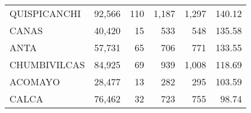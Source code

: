 \begin{tabular}{lrrrrr}
	\cellcolor[HTML]{FFFFC7}QUISPICANCHI                                               & 92,566                                                         & 110                                                      & 1,187                                                    & 1,297                                                               & 140.12                                                                       \\
	\cellcolor[HTML]{FFFFC7}CANAS                                                      & 40,420                                                         & 15                                                       & 533                                                      & 548                                                                 & 135.58                                                                       \\
	\cellcolor[HTML]{FFFFC7}ANTA                                                       & 57,731                                                         & 65                                                       & 706                                                      & 771                                                                 & 133.55                                                                       \\
	\cellcolor[HTML]{9AFF99}CHUMBIVILCAS                                               & 84,925                                                         & 69                                                       & 939                                                      & 1,008                                                               & 118.69                                                                       \\
	\cellcolor[HTML]{9AFF99}ACOMAYO                                                    & 28,477                                                         & 13                                                       & 282                                                      & 295                                                                 & 103.59                                                                       \\
	\cellcolor[HTML]{9AFF99}CALCA                                                      & 76,462                                                         & 32                                                       & 723                                                      & 755                                                                 & 98.74                                                                        \\

\end{tabular}
